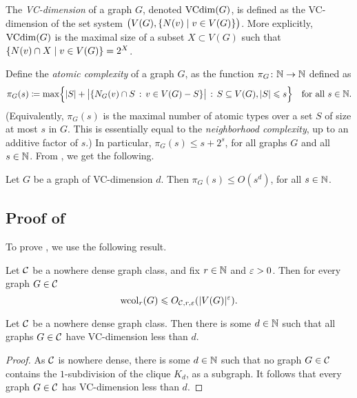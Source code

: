 The \emph{VC-dimension} of a graph $G$, denoted $\operatorname{VCdim}(G)$, 
is defined as the VC-dimension of the set system $\bigl(V(G),\{N(v)\mid v\in V(G)\}\bigr)$.
More explicitly, $\operatorname{VCdim}(G)$ is the maximal size of a subset $X\subset V(G)$
such that $\{N(v)\cap X\mid v\in V(G)\}=2^X$.

Define the \emph{atomic complexity} of a graph $G$, as the function $\pi_G\colon\mathbb N\to\mathbb N$ defined as
 $$\pi_G(s)\coloneqq\max\Bigl\{|S|+\bigl|\{N_G(v)\cap S\,:\,v\in V(G)-S\}\bigr|\,:\, S\subseteq V(G), |S|\leqslant s\Bigr\} \quad\text{for all }s \in \mathbb N.$$
(Equivalently, $\pi_G(s)$ is the maximal number of atomic types over a set $S$ of size at most $s$ in $G$. This is essentially equal to the \emph{neighborhood complexity}, up to an additive factor of $s$.) 
In particular, $\pi_G(s)\le s+2^s$, for all graphs $G$ and all $s\in\mathbb N$.
From , we get the following.
\begin{corollary}\label{cor:sauer-shelah}
    Let $G$ be a graph of VC-dimension $d$.
    Then $\pi_G(s)\le O(s^d)$, for all $s\in \mathbb N$.
\end{corollary}



\subsection{Proof of }


To prove , we use the following result.
\begin{fact}\label{fact:nd-wcol}
    Let $\mathcal C$ be a nowhere dense graph class, and fix $r\in\mathbb N$ and $\varepsilon>0$.
    Then for every graph $G\in\mathcal C$
    $$\operatorname{wcol}_r(G)\leqslant O_{\mathcal C,r,\varepsilon}(|V(G)|^{\varepsilon}).$$
\end{fact}

\begin{lemma}\label{lem:nd-VC}
    Let $\mathcal C$ be a nowhere dense graph class. 
    Then there is some $d\in \mathbb N$ such that all graphs $G\in \mathcal C$ have VC-dimension less than $d$.
\end{lemma}
\begin{proof}
    As $\mathcal C$ is nowhere dense, there is some $d\in\mathbb N$ such that 
    no graph $G\in \mathcal C$ contains the $1$-subdivision of the clique $K_d$, as a subgraph.
    It follows that every graph $G\in \mathcal C$ has VC-dimension less than $d$.
\end{proof}


